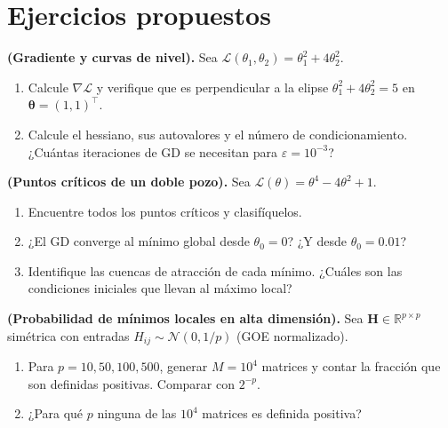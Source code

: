 \section*{Ejercicios propuestos}

\begin{ejercicio}
\textbf{(Gradiente y curvas de nivel).}
Sea $\mathcal{L}(\theta_1,\theta_2) = \theta_1^2 + 4\theta_2^2$.
\begin{enumerate}[label=(\alph*)]
  \item Calcule $\nabla\mathcal{L}$ y verifique que es perpendicular
        a la elipse $\theta_1^2 + 4\theta_2^2 = 5$ en
        $\bm{\theta} = (1,1)^\top$.
  \item Calcule el hessiano, sus autovalores y el número de
        condicionamiento. ¿Cuántas iteraciones de GD se necesitan para
        $\varepsilon = 10^{-3}$?
\end{enumerate}
\end{ejercicio}

\begin{ejercicio}
\textbf{(Puntos críticos de un doble pozo).}
Sea $\mathcal{L}(\theta) = \theta^4 - 4\theta^2 + 1$.
\begin{enumerate}[label=(\alph*)]
  \item Encuentre todos los puntos críticos y clasifíquelos.
  \item ¿El GD converge al mínimo global desde $\theta_0 = 0$?
        ¿Y desde $\theta_0 = 0.01$?
  \item Identifique las cuencas de atracción de cada mínimo. ¿Cuáles
        son las condiciones iniciales que llevan al máximo local?
\end{enumerate}
\end{ejercicio}

\begin{ejercicio}
\textbf{(Probabilidad de mínimos locales en alta dimensión).}
Sea $\bm{H} \in \mathbb{R}^{p \times p}$ simétrica con entradas
$H_{ij} \sim \mathcal{N}(0, 1/p)$ (GOE normalizado).
\begin{enumerate}[label=(\alph*)]
  \item Para $p = 10, 50, 100, 500$, generar $M = 10^4$ matrices y
        contar la fracción que son definidas positivas. Comparar con
        $2^{-p}$.
  \item ¿Para qué $p$ ninguna de las $10^4$ matrices es definida
        positiva?
\end{enumerate}
\end{ejercicio}

